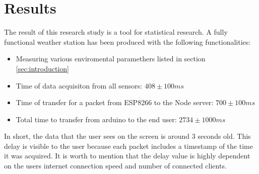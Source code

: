 \section{Results}
\label{sec:results}
The result of this research study is a tool for statistical research. A fully functional
weather station has been produced with the following functionalities:
\begin{itemize}
  \item Measuring various enviromental paramethers listed in section \ref{sec:introduction}
  \item Time of data acquisiton from all sensors: $408\pm 100 ms$
  \item Time of transfer for a packet from ESP8266 to the Node server: $700\pm100ms$
  \item Total time to transfer from arduino to the end user: $2734\pm1000ms$
\end{itemize}

In short, the data that the user sees on the screen is around 3 seconds old. This delay is visible to the user because each packet includes a timestamp
of the time it was acquired.
It is worth to mention that the delay value is highly dependent on the users internet connection speed and number of connected clients.
